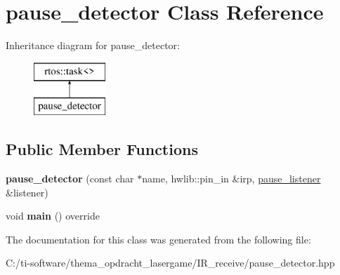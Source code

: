 \hypertarget{classpause__detector}{}\section{pause\+\_\+detector Class Reference}
\label{classpause__detector}
Inheritance diagram for pause\+\_\+detector\+:\begin{figure}[H]
\begin{center}
\leavevmode
\includegraphics[height=2.000000cm]{classpause__detector}
\end{center}
\end{figure}
\subsection*{Public Member Functions}
\begin{DoxyCompactItemize}
\item 
\mbox{\label{classpause__detector_a86b2fb4fd1032eb81517bc27ee9f6f2e}} 
{\bfseries pause\+\_\+detector} (const char $\ast$name, hwlib\+::pin\+\_\+in \&irp, \mbox{\hyperlink{classpause__listener}{pause\+\_\+listener}} \&listener)
\item 
\mbox{\label{classpause__detector_ac2d43c7fd2489b622359de11bfdc1cc2}} 
void {\bfseries main} () override
\end{DoxyCompactItemize}


The documentation for this class was generated from the following file\+:\begin{DoxyCompactItemize}
\item 
C\+:/ti-\/software/thema\+\_\+opdracht\+\_\+lasergame/\+I\+R\+\_\+receive/pause\+\_\+detector.\+hpp\end{DoxyCompactItemize}
